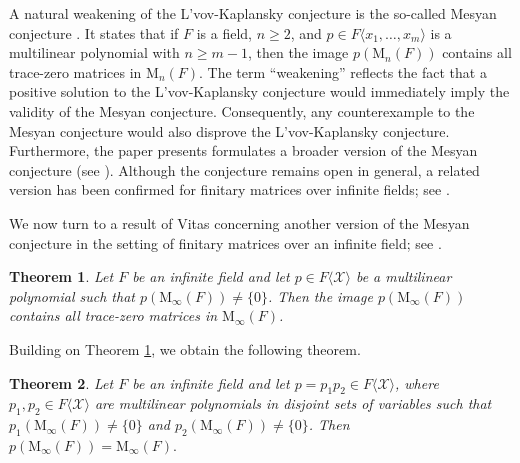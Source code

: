 \documentclass[11pt]{article}
\newtheorem{theorem}{Theorem}
\theoremstyle{definition}
\begin{document}
{{{{				A natural weakening of the L’vov-Kaplansky conjecture is the so-called Mesyan conjecture \cite[Conjecture 11]{Pa_Me_13}. It states that if \( F \) is a field, \( n \ge 2 \), and \( p \in F\langle x_1, \ldots, x_m \rangle \) is a multilinear polynomial with \( n \ge m-1 \), then the image \( p(\mathrm{M}_n(F)) \) contains all trace-zero matrices in $\mathrm{M}_n(F)$. The term ``weakening'' reflects the fact that a positive solution to the L’vov-Kaplansky conjecture would immediately imply the validity of the Mesyan conjecture. Consequently, any counterexample to the Mesyan conjecture would also disprove the L’vov-Kaplansky conjecture. Furthermore, the paper \cite{Pa_Fa_22} presents formulates a broader version of the Mesyan conjecture (see \cite[Conjecture 3.3]{Pa_Fa_22}). Although the conjecture remains open in general, a related version has been confirmed for finitary matrices over infinite fields; see \cite[Corollary~1.2]{Pa_Vitas_21}.
				
				We now turn to a result of Vitas concerning another version of the Mesyan conjecture in the setting of finitary matrices over an infinite field; see \cite[Corollary~1.2]{Pa_Vitas_21}.
				
				\begin{theorem} \label{Vitas}
					Let \( F \) be an infinite field and let \( p \in F\langle \mathcal{X} \rangle \) be a multilinear polynomial such that \( p(\mathrm{M}_\infty(F)) \neq \{0\} \). Then the image \( p(\mathrm{M}_\infty(F)) \) contains all trace-zero matrices in \( \mathrm{M}_\infty(F) \).
				\end{theorem}
				
				Building on Theorem \ref{Vitas}, we obtain the following theorem.
				
				\begin{theorem} \label{Vitas1}
					Let \( F \) be an infinite field and let  \( p = p_1 p_2 \in F\langle \mathcal{X} \rangle \), where \( p_1, p_2 \in F\langle \mathcal{X} \rangle \) are multilinear polynomials in disjoint sets of variables such that \( p_1(\mathrm{M}_\infty(F)) \neq \{0\} \) and \( p_2(\mathrm{M}_\infty(F)) \neq \{0\} \). Then
					$p(\mathrm{M}_\infty(F)) = \mathrm{M}_\infty(F).$
				\end{theorem}
				
}}}}
\end{document}
